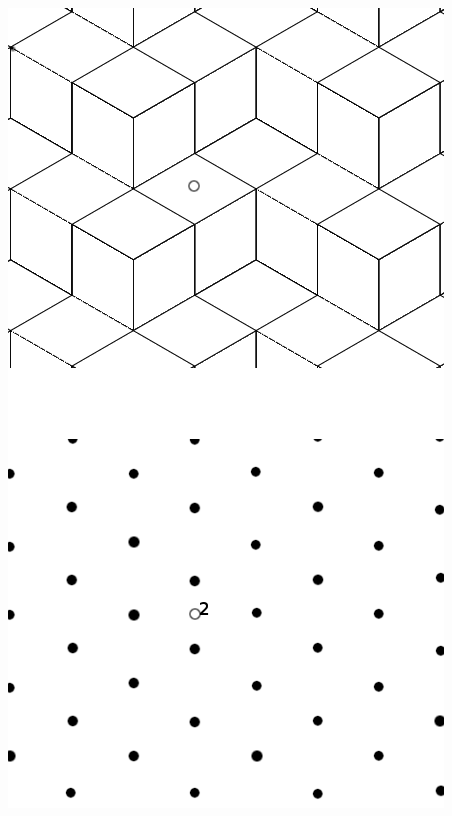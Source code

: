 \documentclass[12pt]{article}
\begin{document}
\begin{enumerate}
\begin{center}
\includegraphics[scale=0.70]{exam.png}
\end{center}
\end{enumerate}
\end{document}

